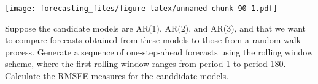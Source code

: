 \documentclass[
  oneside]{book}
\newenvironment{Shaded}{\begin{snugshade}}{\end{snugshade}}
\newcommand{\AttributeTok}[1]{\textcolor[rgb]{0.77,0.63,0.00}{#1}}
\newcommand{\ConstantTok}[1]{\textcolor[rgb]{0.00,0.00,0.00}{#1}}
\newcommand{\ControlFlowTok}[1]{\textcolor[rgb]{0.13,0.29,0.53}{\textbf{#1}}}
\newcommand{\DecValTok}[1]{\textcolor[rgb]{0.00,0.00,0.81}{#1}}
\newcommand{\FunctionTok}[1]{\textcolor[rgb]{0.00,0.00,0.00}{#1}}
\newcommand{\NormalTok}[1]{#1}
\newcommand{\OtherTok}[1]{\textcolor[rgb]{0.56,0.35,0.01}{#1}}
\newcommand{\SpecialCharTok}[1]{\textcolor[rgb]{0.00,0.00,0.00}{#1}}
\newcommand{\StringTok}[1]{\textcolor[rgb]{0.31,0.60,0.02}{#1}}
\begin{document}
\texttt{[image: forecasting\_files/figure-latex/unnamed-chunk-90-1.pdf]}

Suppose the candidate models are AR(1), AR(2), and AR(3), and that we want to compare forecasts obtained from these models to those from a random walk process. Generate a sequence of one-step-ahead forecasts using the rolling window scheme, where the first rolling window ranges from period 1 to period 180. Calculate the RMSFE measures for the canddidate models.

\begin{Shaded}
\end{Shaded}
\end{document}
